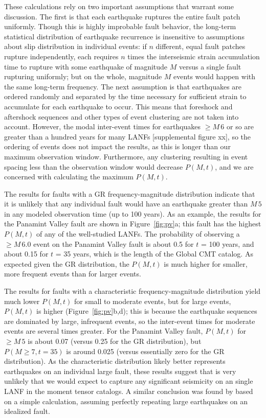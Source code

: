 \documentclass[draft,grl]{AGUTeX}
\begin{document}
\begin{article}
These calculations rely on two important assumptions that warrant some
discussion.  The first is that each earthquake ruptures the entire
fault patch uniformly.  Though this is highly improbable fault behavior,
the long-term statistical distribution of earthquake recurrence is 
insensitive to assumptions about slip distribution in individual events:
if $n$ different, equal fault patches rupture independently, each 
requires $n$ times the interseismic strain accumulation time to rupture with
some earthquake of magnitude $M$ versus a single fault rupturing uniformly; 
but on the whole, magnitude $M$ events would happen with the same long-term
frequency.  The next assumption is that earthquakes are ordered randomly and
separated by the time necessary for sufficient strain to accumulate for each
earthquake to occur.  This means that foreshock and aftershock sequences
and other types of event clustering are not taken into account.  However,
the modal inter-event times for earthquakes $\ge M \,6$ or so are greater than
a hundred years for many LANFs [supplemental figure xx], so the ordering of
events does not impact the results, as this is longer than our maximum
observation window.  Furthermore, any clustering resulting in
event spacing less than the observation window would decrease $P(M,t)$, and
we are concerned with calculating the maximum $P(M,t)$.

The results for faults with a GR frequency-magnitude distribution
indicate that it is unlikely that any individual fault would have an earthquake
greater than $M \, 5$ in any modeled observation time (up to 100 years).  
As an example, the results for the Panamint Valley fault are shown in
Figure~\ref{fig:pv}a;
this fault has the highest $P(M,t)$ of any of the well-studied LANFs.  The
probability of observing a $\ge M \, 6.0$ event on the Panamint Valley fault 
is about 0.5 for $t$ = 100 years, and about 0.15 for $t$ = 35 years, which is
the length of the Global CMT catalog. As expected given the GR distribution,
the $P(M,t)$ is much higher for smaller, more frequent events than for larger
events.  

The results for faults with a characteristic frequency-magnitude distribution
yield much lower $P(M,t)$ for small to moderate events, but for large events,
$P(M,t)$ is higher (Figure~\ref{fig:pv}b,d); this is because the earthquake
sequences are dominated by large, infrequent events, so the inter-event times
for moderate events are several times greater. For the Panamint Valley fault,
$P(M,t)$ for $ \ge M \, 5$ is about 0.07 (versus 0.25 for the GR distribution),
but $P(M\ge 7, t=35)$ is around 0.025 (versus essentially zero for the GR
distribution).  As the characteristic distribution likely better represents
earthquakes on an individual large fault, these results suggest that is 
very unlikely that we would expect to capture any significant seismicity
on an single LANF in the moment tensor catalogs. A similar conclusion was 
found by \citet{wernicke1995seis} based on a simple calculation, 
assuming perfectly repeating large earthquakes on an idealized fault. 
 

\end{article}
\end{document}
